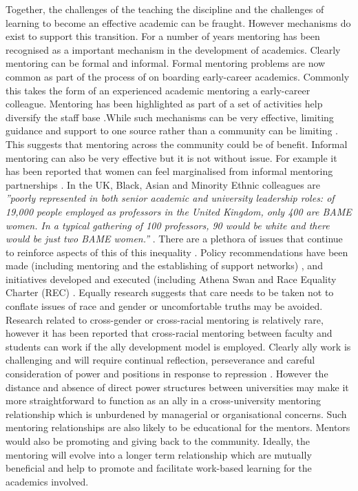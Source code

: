 \documentclass[sigconf]{acmart}
\begin{document}
Together, the challenges of the teaching the discipline and the challenges of learning to become an effective academic can be fraught. However mechanisms do exist to support this transition. For a number of years  mentoring has been recognised as a important mechanism in the development of academics. Clearly mentoring can be formal and informal. Formal mentoring problems are now common as part of the process of on boarding early-career academics.  Commonly this takes the form of an experienced academic mentoring a early-career colleague. Mentoring has been highlighted as part of a set of activities help diversify the staff base \cite{Golubchik2018}.While such mechanisms can be very effective, limiting guidance and support to one source rather than a community can be limiting \cite{deJanasz}. This suggests that mentoring across the community could be of benefit.  Informal mentoring can also be very effective but it is not without issue. For example it has been reported that women can feel marginalised from informal mentoring partnerships \cite{gibson2006mentoring}.   In the UK, Black, Asian and Minority Ethnic colleagues are \textit{''poorly represented in both senior academic and university leadership roles: of 19,000 people employed as professors in the United Kingdom, only 400 are BAME women. In a typical gathering of 100 professors, 90 would be white and there would be just two BAME women.''} \cite[p.~I]{UniversitiesUK19}. There are a plethora of issues that continue to reinforce aspects of this of this inequality \cite{arday20}. Policy recommendations have been made (including mentoring and the establishing of support networks) \cite{bhopal2014experiences}, and initiatives developed and executed (including Athena Swan \cite{AthenaSwan} and Race Equality Charter (REC)  \cite{REC}. Equally research suggests that care needs to be taken not to conflate issues of race and gender \cite{Bhopal19} or uncomfortable truths may be avoided. Research related to cross-gender or cross-racial mentoring is relatively rare, however it has been reported that cross-racial mentoring between faculty and students can work \cite{reddick2016don} if the ally development model is employed. Clearly ally work is challenging and will require continual reflection, perseverance and careful consideration of power and positions in response to repression \cite{Patton2015}. However the distance and absence of direct power structures between universities may make it more straightforward to function as an ally in a cross-university mentoring relationship which is unburdened by managerial or organisational concerns. Such mentoring relationships are also likely to be educational for the mentors. Mentors would also be promoting and giving back to the community. Ideally, the mentoring will evolve into a longer term relationship which are mutually beneficial and help to promote and facilitate work-based learning for the academics involved.
\end{document}
